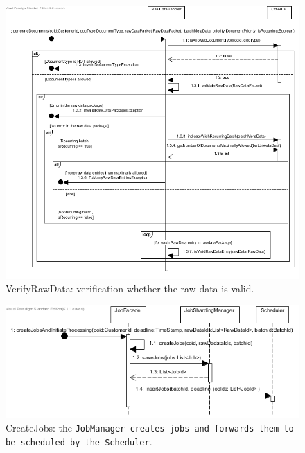 \documentclass[a4paper,10pt]{article}
\begin{document}
\begin{figure}[!htp]
    \centering
    \includegraphics[width=\textwidth]{Seq_VerifyRawData.png}
    \caption{VerifyRawData: verification whether the raw data is valid.
        }\label{fig:seq_VerifyRawData}
\end{figure}

\begin{figure}[!htp]
    \centering
    \includegraphics[width=\textwidth]{Seq_CreateJobs.png}
    \caption{CreateJobs: the \texttt{JobManager creates jobs and forwards them to be scheduled by the \texttt{Scheduler}}.
        }\label{fig:seq_CreateJobs}
\end{figure}
\end{document}
